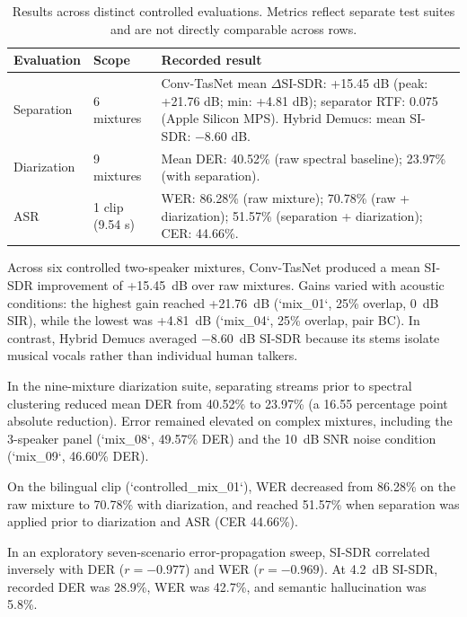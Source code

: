 \documentclass[11pt,a4paper,twocolumn]{article}
\begin{document}
\begin{table}[ht]
\centering
\small
\begin{tabularx}{\linewidth}{@{}l l X@{}}
\toprule
Evaluation & Scope & Recorded result \\
\midrule
Separation & 6 mixtures & Conv-TasNet mean $\Delta$SI-SDR: +15.45 dB (peak: +21.76 dB; min: +4.81 dB); separator RTF: 0.075 (Apple Silicon MPS). Hybrid Demucs: mean SI-SDR: $-8.60$ dB. \\
Diarization & 9 mixtures & Mean DER: 40.52\% (raw spectral baseline); 23.97\% (with separation). \\
ASR & 1 clip (9.54 s) & WER: 86.28\% (raw mixture); 70.78\% (raw + diarization); 51.57\% (separation + diarization); CER: 44.66\%. \\
\bottomrule
\end{tabularx}
\caption{Results across distinct controlled evaluations. Metrics reflect separate test suites and are not directly comparable across rows.}
\label{tab:results}
\end{table}

Across six controlled two-speaker mixtures, Conv-TasNet produced a mean SI-SDR improvement of +15.45~dB over raw mixtures. Gains varied with acoustic conditions: the highest gain reached +21.76~dB (`mix\_01`, 25\% overlap, 0~dB SIR), while the lowest was +4.81~dB (`mix\_04`, 25\% overlap, pair BC). In contrast, Hybrid Demucs averaged $-8.60$~dB SI-SDR because its stems isolate musical vocals rather than individual human talkers.

In the nine-mixture diarization suite, separating streams prior to spectral clustering reduced mean DER from 40.52\% to 23.97\% (a 16.55 percentage point absolute reduction). Error remained elevated on complex mixtures, including the 3-speaker panel (`mix\_08`, 49.57\% DER) and the 10~dB SNR noise condition (`mix\_09`, 46.60\% DER).

On the bilingual clip (`controlled\_mix\_01`), WER decreased from 86.28\% on the raw mixture to 70.78\% with diarization, and reached 51.57\% when separation was applied prior to diarization and ASR (CER 44.66\%).

In an exploratory seven-scenario error-propagation sweep, SI-SDR correlated inversely with DER ($r = -0.977$) and WER ($r = -0.969$). At 4.2~dB SI-SDR, recorded DER was 28.9\%, WER was 42.7\%, and semantic hallucination was 5.8\%.
\end{document}
